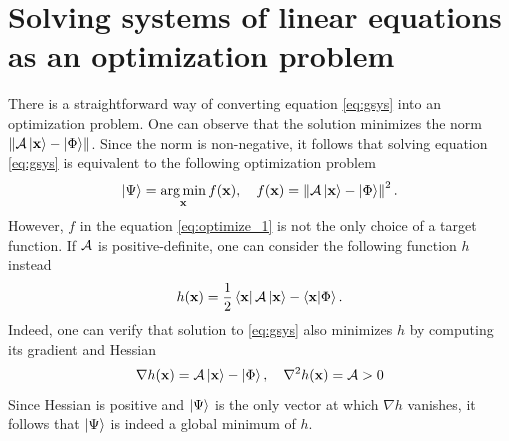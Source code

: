 \section{Solving systems of linear equations as an optimization problem}
There is a straightforward way of converting equation \eqref{eq:gsys} into an
optimization problem. One can observe that the solution minimizes the norm
$\left\Vert \mathcal{A}\ket{\mathbf{x}} - \ket{\Phi}\right\Vert$. Since the
norm is non-negative, it follows that solving equation \eqref{eq:gsys} is
equivalent to the following optimization problem
\begin{equation}
  \label{eq:optimize_1}
  \ket{\Psi} = \operatorname*{arg\,min}_{\mathbf{x}} f(\mathbf{x}), \quad f({\mathbf x}) = \left\Vert \mathcal{A}\ket{\mathbf{x}} - \ket{\Phi}\right\Vert^2.
\end{equation}
However, $f$ in the equation \eqref{eq:optimize_1} is not the only choice of a
target function. If $\mathcal{A}$ is positive-definite, one can consider the
following function $h$ instead
\begin{equation}
  \label{eq:optimize_2}
  h(\mathbf{x})=\frac{1}{2}\bra{\mathbf{x}}\mathcal{A}\ket{\mathbf{x}} -
  \braket{\mathbf{x}}{\Phi}.
\end{equation}
Indeed, one can verify that solution to \eqref{eq:gsys} also minimizes $h$ by
computing its gradient and Hessian
\begin{equation}
  \nabla h(\mathbf{x}) = \mathcal{A}\ket{\mathbf{x}}-\ket{\Phi}, \quad \nabla^2 h({\mathbf
    x})=\mathcal{A}>0
\end{equation}
Since Hessian is positive and $\ket{\Psi}$ is the only vector at which $\nabla
  h$ vanishes, it follows that $\ket{\Psi}$ is indeed a global minimum of $h$.


